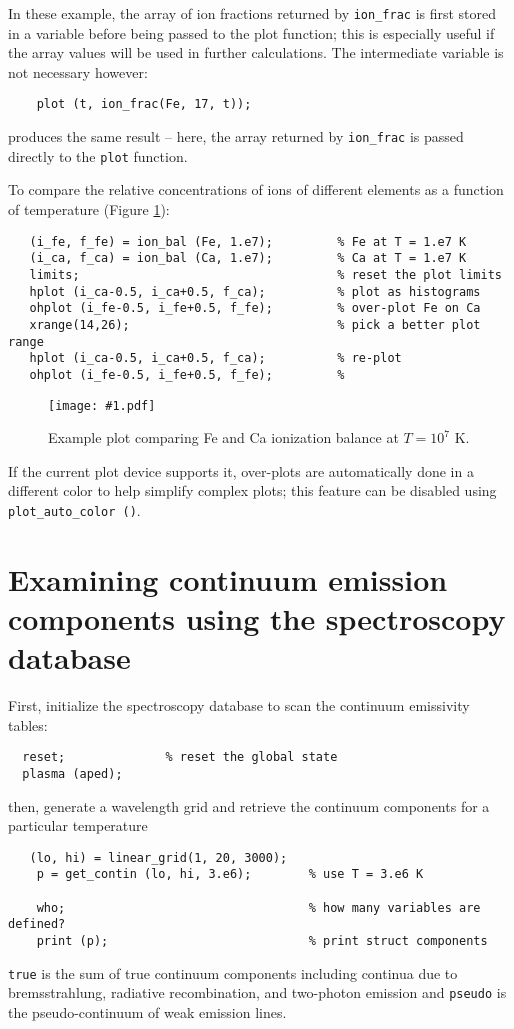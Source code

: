 \documentclass{book}
\newcommand{\putfig}[1]{\texttt{[image: \#1.pdf]}}
\newcommand{\putfig}[1]{\psfig{file=#1.ps}}
\begin{document}
In these example, the array of ion fractions returned by {\tt ion\_frac} is
first stored in a variable before being passed to the plot function;  this
is especially useful if the array values will be used in further calculations.
The intermediate variable is not necessary however:
\begin{verbatim}
    plot (t, ion_frac(Fe, 17, t));
\end{verbatim}
produces the same result -- here, the array returned by {\tt ion\_frac} is
passed directly to the {\tt plot} function.

To compare the relative concentrations of ions of different elements
as a function of temperature (Figure \ref{fig:ion_bal}):

\begin{verbatim}
   (i_fe, f_fe) = ion_bal (Fe, 1.e7);         % Fe at T = 1.e7 K
   (i_ca, f_ca) = ion_bal (Ca, 1.e7);         % Ca at T = 1.e7 K
   limits;                                    % reset the plot limits
   hplot (i_ca-0.5, i_ca+0.5, f_ca);          % plot as histograms
   ohplot (i_fe-0.5, i_fe+0.5, f_fe);         % over-plot Fe on Ca
   xrange(14,26);                             % pick a better plot range
   hplot (i_ca-0.5, i_ca+0.5, f_ca);          % re-plot
   ohplot (i_fe-0.5, i_fe+0.5, f_fe);         %
\end{verbatim}

\begin{figure}[ht]
\putfig{figures/ion_bal}
\caption{Example plot comparing Fe and Ca ionization balance at $T = 10^7$ K.}
\label{fig:ion_bal}
\end{figure}

If the current plot device supports it, over-plots are automatically done
in a different color to help simplify complex plots; this feature can be
disabled using {\tt plot\_auto\_color ()}.

\section{Examining continuum emission components using the spectroscopy
database}

First, initialize the spectroscopy database to scan the continuum
emissivity tables:
 \begin{verbatim}
  reset;              % reset the global state
  plasma (aped);
 \end{verbatim}
then, generate a wavelength grid and retrieve the continuum components
for a particular temperature
\begin{verbatim}
   (lo, hi) = linear_grid(1, 20, 3000);
    p = get_contin (lo, hi, 3.e6);        % use T = 3.e6 K

    who;                                  % how many variables are defined?
    print (p);                            % print struct components
\end{verbatim}
{\tt true} is the sum of true continuum components including
continua due to bremsstrahlung, radiative recombination, and
two-photon emission and {\tt pseudo} is the pseudo-continuum of weak
emission lines.
\end{document}
